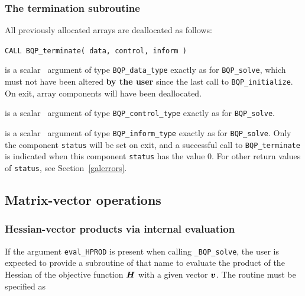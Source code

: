 \documentclass{galahad}
\newcommand{\packagename}{BQP}
\newcommand{\fullpackagename}{\libraryname\_\packagename}
\newcommand{\solver}{{\tt \fullpackagename\_solve}}
\begin{document}
\subsubsection{The  termination subroutine}
All previously allocated arrays are deallocated as follows:
\vspace*{1mm}

\hspace{8mm}
{\tt CALL \packagename\_terminate( data, control, inform )}

\vspace*{-3mm}
\begin{description}

 is a scalar \intentinout\ argument of type 
{\tt \packagename\_data\_type} 
exactly as for
{\tt \packagename\_solve},
which must not have been altered {\bf by the user} since the last call to 
{\tt \packagename\_initialize}.
On exit, array components will have been deallocated.

 is a scalar \intentin\ argument of type 
{\tt \packagename\_control\_type}
exactly as for
{\tt \packagename\_solve}.

 is a scalar \intentout\ argument of type
{\tt \packagename\_inform\_type}
exactly as for
{\tt \packagename\_solve}.
Only the component {\tt status} will be set on exit, and a 
successful call to 
{\tt \packagename\_terminate}
is indicated when this  component {\tt status} has the value 0. 
For other return values of {\tt status}, see Section~\ref{galerrors}.

\end{description}



\subsection{Matrix-vector operations\label{fdv}}


\subsubsection{Hessian-vector products via internal evaluation\label{prodfv}}

If the argument {\tt eval\_HPROD} is present when calling \solver, the
user is expected to provide a subroutine of that name to evaluate the
product of the Hessian of the objective function ${\bm{H}}$
with a given vector ${\bm{v}}$.
The routine must be specified as
\end{document}
